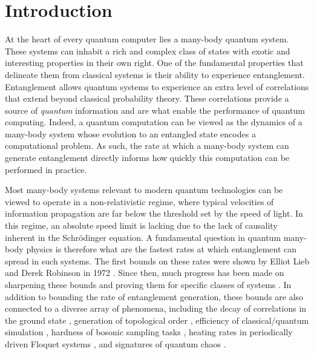 \chapter{Introduction}


At the heart of every quantum computer lies a many-body quantum system. These systems can inhabit a rich and complex class of states with exotic and interesting properties in their own right. One of the fundamental properties that delineate them from classical systems is their ability to experience entanglement. Entanglement allows quantum systems to experience an extra level of correlations that extend beyond classical probability theory. These correlations provide a source of \emph{quantum} information and are what enable the performance of quantum computing. Indeed, a quantum computation can be viewed as the dynamics of a many-body system whose evolution to an entangled state encodes a computational problem. As such, the rate at which a many-body system can generate entanglement directly informs how quickly this computation can be performed in practice.

Most many-body systems relevant to modern quantum technologies can be viewed to operate in a non-relativistic regime,
where typical velocities of information propagation are far below the threshold set by the speed of light. In this regime, an absolute speed limit is lacking due to the lack of causality inherent in the Schr\"odinger equation. A fundamental question in quantum many-body physics is therefore what are the fastest rates at which entanglement can spread in such systems.
The first bounds on these rates were shown by Elliot Lieb and Derek Robinson in 1972 \cite{LR}.
Since then, much progress has been made on sharpening these bounds \cite{ChenLucas2021graphtheory,WangHazzard2020} and proving them for specific classes of systems \cite{Tran2019a,Chen2019,kuwaharaStrictlyLinearLight2020,Tran2021b}.
In addition to bounding the rate of entanglement generation, these bounds are also connected to a diverse array of phenomena, including the decay of correlations in the ground state \cite{Hastings2006}, generation of topological order \cite{Bravyi2006, Bravyi2010}, efficiency of classical/quantum simulation \cite{Osborne2006,Tran2019a}, hardness of bosonic sampling tasks \cite{Deshpande2018}, heating rates in periodically driven Floquet systems \cite{Abanin2015,Tran2019b}, and signatures of quantum chaos \cite{Lashkari2013,Guo2019}.

